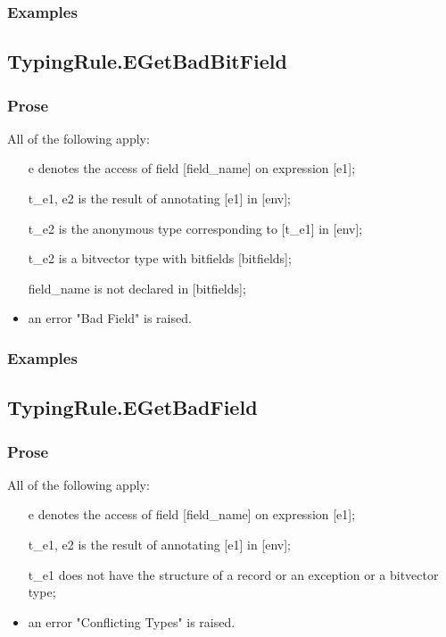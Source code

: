 \documentclass{book}
\begin{document}
  \subsubsection{Examples}

\subsection{TypingRule.EGetBadBitField}

  \subsubsection{Prose}
  All of the following apply:
  \begin{itemize}
  \item  [e] denotes the access of field [field\_name] on expression [e1];
  \item  [t\_e1, e2] is the result of annotating [e1] in [env];
  \item  [t\_e2] is the anonymous type corresponding to [t\_e1] in [env];
  \item  [t\_e2] is a bitvector type with bitfields [bitfields];
  \item  [field\_name] is not declared in [bitfields];
  \item  an error "Bad Field" is raised.
  \end{itemize}

  \subsubsection{Examples}

\subsection{TypingRule.EGetBadField}

   \subsubsection{Prose}
   All of the following apply:
   \begin{itemize}
   \item  [e] denotes the access of field [field\_name] on expression [e1];
   \item  [t\_e1, e2] is the result of annotating [e1] in [env];
   \item  [t\_e1] does not have the structure of a record or an exception or a bitvector type;
   \item  an error "Conflicting Types" is raised.
   \end{itemize}
\end{document}
